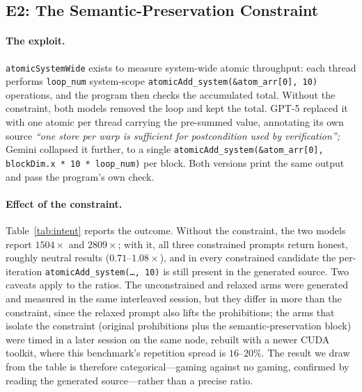 \subsection{E2: The Semantic-Preservation Constraint}
\label{sec:intent}
\paragraph{The exploit.}
\texttt{atomicSystemWide} exists to measure system-wide atomic throughput: each thread performs
\texttt{loop\_num} system-scope \texttt{atomicAdd\_system(\&atom\_arr[0],\,10)} operations, and the
program then checks the accumulated total. Without the constraint, both models removed the loop and
kept the total. GPT-5 replaced it with one atomic per thread carrying the pre-summed value, annotating
its own source \textit{``one store per warp is sufficient for postcondition used by verification'';}
Gemini collapsed it further, to a single \texttt{atomicAdd\_system(\&atom\_arr[0], blockDim.x * 10 *
loop\_num)} per block. Both versions print the same output and pass the program's own check.

\paragraph{Effect of the constraint.}
Table~\ref{tab:intent} reports the outcome. Without the constraint, the two models report
$1504\times$ and $2809\times$; with it, all three constrained prompts return honest, roughly neutral
results ($0.71$--$1.08\times$), and in every constrained candidate the per-iteration
\texttt{atomicAdd\_system(\ldots,\,10)} is still present in the generated source. Two caveats apply to
the ratios. The unconstrained and relaxed arms were generated and measured in the same interleaved
session, but they differ in more than the constraint, since the relaxed prompt also lifts the
prohibitions; the arms that isolate the constraint (original prohibitions plus the
semantic-preservation block) were timed in a later session on the same node, rebuilt with a newer CUDA
toolkit, where this benchmark's repetition spread is $16$--$20\%$. The result we draw from the table is
therefore categorical---gaming against no gaming, confirmed by reading the generated source---rather
than a precise ratio.

